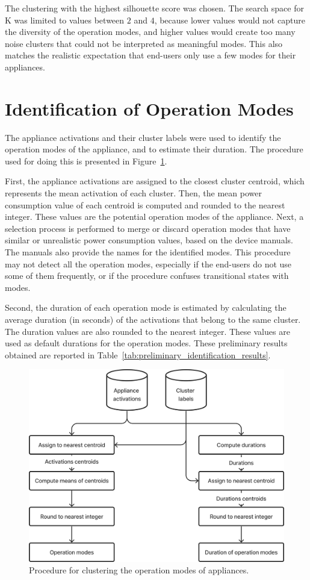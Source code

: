 The clustering with the highest silhouette score was chosen. The search space for K was limited to values between $2$ and $4$, because lower values would not capture the diversity of the operation modes, and higher values would create too many noise clusters that could not be interpreted as meaningful modes. This also matches the realistic expectation that end-users only use a few modes for their appliances.

\section{Identification of Operation Modes}

The appliance activations and their cluster labels were used to identify the operation modes of the appliance, and to estimate their duration. The procedure used for doing this is presented in Figure~\ref{fig:identification}.

First, the appliance activations are assigned to the closest cluster centroid, which represents the mean activation of each cluster. Then, the mean power consumption value of each centroid is computed and rounded to the nearest integer. These values are the potential operation modes of the appliance. Next, a selection process is performed to merge or discard operation modes that have similar or unrealistic power consumption values, based on the device manuals. The manuals also provide the names for the identified modes. This procedure may not detect all the operation modes, especially if the end-users do not use some of them frequently, or if the procedure confuses transitional states with modes.

Second, the duration of each operation mode is estimated by calculating the average duration (in seconds) of the activations that belong to the same cluster. The duration values are also rounded to the nearest integer. These values are used as default durations for the operation modes. These preliminary results obtained are reported in Table~\ref{tab:preliminary_identification_results}.

\begin{figure}[h]
    \centering
    \includegraphics[width=.55\linewidth]{images/identification.png}
    \caption{Procedure for clustering the operation modes of appliances.}
    \label{fig:identification}
\end{figure}


